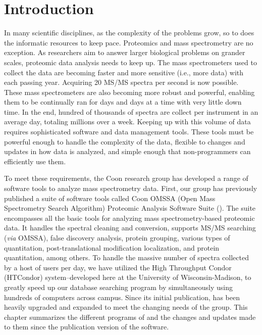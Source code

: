 \section{Introduction}
In many scientific disciplines, as the complexity of the problems grow, so to does the informatic resources to keep pace. Proteomics and mass spectrometry are no exception. As researchers aim to answer larger biological problems on grander scales, proteomic data analysis needs to keep up. The mass spectrometers used to collect the data are becoming faster and more sensitive (i.e., more data) with each passing year. Acquiring 20 MS/MS spectra per second is now possible. These mass spectrometers are also becoming more robust and powerful, enabling them to be continually ran for days and days at a time with very little down time. In the end, hundred of thousands of spectra are collect per instrument in an average day, totaling millions over a week. Keeping up with this volume of data requires sophisticated software and data management tools. These tools must be powerful enough to handle the complexity of the data, flexible to changes and updates in how data is analyzed, and simple enough that non-programmers can efficiently use them. 

To meet these requirements, the Coon research group has developed a range of software tools to analyze mass spectrometry data. First, our group has previously published a suite of software tools called Coon OMSSA (Open Mass Spectrometry Search Algorithm) Proteomic Analysis Software Suite (\compass{}).\cite{compass} The suite encompasses all the basic tools for analyzing mass spectrometry-based proteomic data. It handles the spectral cleaning and conversion, supports MS/MS searching (\emph{via} OMSSA\cite{omssa}), false discovery analysis, protein grouping, various types of quantitation, post-translational modification localization, and protein quantitation, among others. To handle the massive number of spectra collected by a host of users per day, we have utilized the High Throughput Condor (HTCondor) system--developed here at the University of Wisconsin-Madison, to greatly speed up our database searching program by simultaneously using hundreds of computers across campus. Since its initial publication, \compass{} has been heavily upgraded and expanded to meet the changing needs of the group. This chapter summarizes the different programs of \compass{} and the changes and updates made to them since the publication version of the software.

